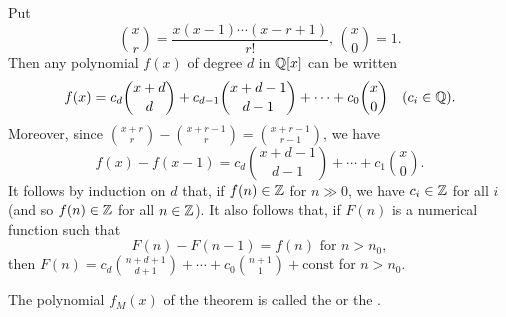 \documentclass[../main]{subfiles}
\begin{document}
\begin{remark}
Put \[\binom{x}{r}=\dfrac{x(x-1)\cdots(x-r+1)}{r!},\, \binom{x}{0}=1.\] Then any polynomial $f(x)$ of degree $d$ in $\mathbb{Q}[x]$ can be written \[f(x)=c_d\binom{x+d}{d}+c_{d-1}\binom{x+d-1}{d-1}+\cdots+c_0\binom{x}{0}\for{c_i\in\bQ}.\] Moreover, since $\displaystyle\binom{x+r}{r}-\binom{x+r-1}{r}=\binom{x+r-1}{r-1}$, we have \[f(x)-f(x-1)=c_d\binom{x+d-1}{d-1}+\cdots+c_1\binom{x}{0}.\] It follows by induction on $d$ that, if $f(n) \in \mathbb{Z}$ for $n \gg 0$, we have $c_i \in \mathbb{Z}$ for all $i$ (and so $f(n) \in \mathbb{Z}$ for all $n \in \mathbb{Z}$). It also follows that, if $F(n)$ is a numerical function such that \[F(n)-F(n-1)=f(n) \text{ for }n>n_0,\] then $\displaystyle F(n)=c_d\binom{n+d+1}{d+1}+\cdots+c_0\binom{n+1}{1}+\text{const}$ for $n>n_0$.
\end{remark}

\begin{remark}
The polynomial $f_M(x)$ of the theorem is called the  or the .
\end{remark}
\end{document}
